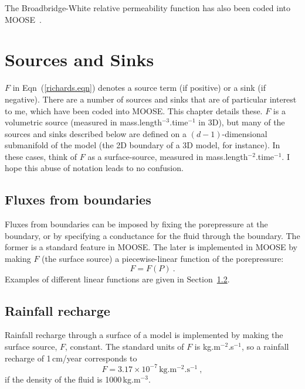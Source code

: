 \documentclass[]{scrreprt}
\begin{document}
The Broadbridge-White relative permeability function has also been coded into MOOSE~\cite{bw1988}.



\chapter{Sources and Sinks}
\label{sources.sinks.chap}

$F$ in Eqn~(\ref{richards.eqn}) denotes a source term (if positive) or
a sink (if negative).  There are a number of sources and sinks that
are of particular interest to me, which have been coded
into MOOSE.  This chapter details these.  $F$ is a volumetric source
(measured in mass.length$^{-3}$.time$^{-1}$ in 3D), but many of the sources
and sinks described below are defined on a $(d-1)$-dimensional
submanifold of the model (the 2D boundary of a 3D model, for
instance).  In these cases, think of $F$ as a surface-source, measured
in mass.length$^{-2}$.time$^{-1}$.  I hope this abuse of notation
leads to no confusion.

\section{Fluxes from boundaries}
\label{fluxes.from.bdy.sec}

Fluxes from boundaries can be imposed by fixing the porepressure at
the boundary, or by specifying a conductance for the fluid through the
boundary.  The former is a standard feature in MOOSE.  The later is
implemented in MOOSE by making $F$ (the surface source) a
piecewise-linear function of the porepressure:
\begin{equation}
F = F(P) \ .
\end{equation}
Examples of different linear functions are given in Section~\ref{rainfall.recharge.sec}.


\section{Rainfall recharge}
\label{rainfall.recharge.sec}

Rainfall recharge through a surface of a model is implemented by
making the surface source, $F$, constant.  The standard
units of $F$ is kg.m$^{-2}$.s$^{-1}$, so a rainfall recharge of
1\,cm/year corresponds to
\begin{equation}
F = 3.17\times 10^{-7}\,\mbox{kg.m$^{-2}$.s$^{-1}$} \ ,
\end{equation}
if the density of the fluid is 1000\,kg.m$^{-3}$.
\end{document}

